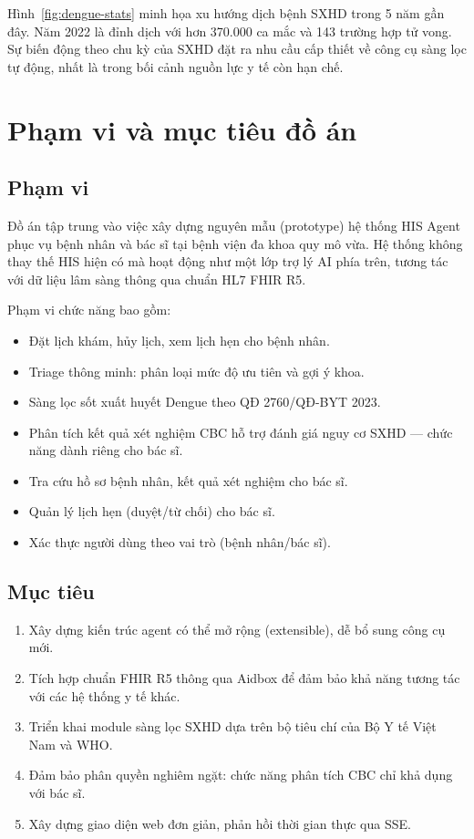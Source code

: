 \documentclass[oneside, a4paper]{book}
\theoremstyle{plain}
\theoremstyle{plain}
\theoremstyle{definition}
\theoremstyle{remark}
\begin{document}
Hình~\ref{fig:dengue-stats} minh họa xu hướng dịch bệnh SXHD trong 5 năm gần đây. Năm 2022 là đỉnh dịch với hơn 370.000 ca mắc và 143 trường hợp tử vong. Sự biến động theo chu kỳ của SXHD đặt ra nhu cầu cấp thiết về công cụ sàng lọc tự động, nhất là trong bối cảnh nguồn lực y tế còn hạn chế.

\section{Phạm vi và mục tiêu đồ án}

\subsection{Phạm vi}

Đồ án tập trung vào việc xây dựng nguyên mẫu (prototype) hệ thống HIS Agent phục vụ bệnh nhân và bác sĩ tại bệnh viện đa khoa quy mô vừa. Hệ thống không thay thế HIS hiện có mà hoạt động như một lớp trợ lý AI phía trên, tương tác với dữ liệu lâm sàng thông qua chuẩn HL7 FHIR R5.

Phạm vi chức năng bao gồm:
\begin{itemize}
  \item Đặt lịch khám, hủy lịch, xem lịch hẹn cho bệnh nhân.
  \item Triage thông minh: phân loại mức độ ưu tiên và gợi ý khoa.
  \item Sàng lọc sốt xuất huyết Dengue theo QĐ 2760/QĐ-BYT 2023.
  \item Phân tích kết quả xét nghiệm CBC hỗ trợ đánh giá nguy cơ SXHD --- chức năng dành riêng cho bác sĩ.
  \item Tra cứu hồ sơ bệnh nhân, kết quả xét nghiệm cho bác sĩ.
  \item Quản lý lịch hẹn (duyệt/từ chối) cho bác sĩ.
  \item Xác thực người dùng theo vai trò (bệnh nhân/bác sĩ).
\end{itemize}

\subsection{Mục tiêu}

\begin{enumerate}
  \item Xây dựng kiến trúc agent có thể mở rộng (extensible), dễ bổ sung công cụ mới.
  \item Tích hợp chuẩn FHIR R5 thông qua Aidbox để đảm bảo khả năng tương tác với các hệ thống y tế khác.
  \item Triển khai module sàng lọc SXHD dựa trên bộ tiêu chí của Bộ Y tế Việt Nam và WHO.
  \item Đảm bảo phân quyền nghiêm ngặt: chức năng phân tích CBC chỉ khả dụng với bác sĩ.
  \item Xây dựng giao diện web đơn giản, phản hồi thời gian thực qua SSE.
\end{enumerate}
\end{document}
